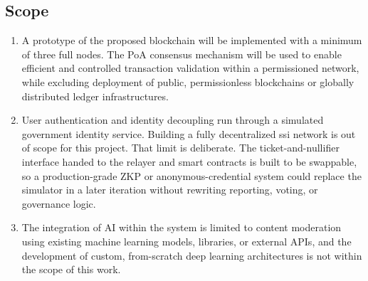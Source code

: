 \subsection{Scope}

\begin{enumerate}
   \item A prototype of the proposed blockchain will be implemented with a minimum of three full nodes. The \ac{PoA} consensus mechanism will be used to enable efficient and controlled transaction validation within a permissioned network, while excluding deployment of public, permissionless blockchains or globally distributed ledger infrastructures. 
   
   \item User authentication and identity decoupling run through a simulated government identity service. Building a fully decentralized \ac{ssi} network is out of scope for this project. That limit is deliberate. The ticket-and-nullifier interface handed to the relayer and smart contracts is built to be swappable, so a production-grade \ac{ZKP} or anonymous-credential system could replace the simulator in a later iteration without rewriting reporting, voting, or governance logic.
   

   
   \item The integration of \ac{AI} within the system is limited to content moderation using existing machine learning models, libraries, or external \ac{API}s, and the development of custom, from-scratch deep learning architectures is not within the scope of this work.
   
   

\end{enumerate}

